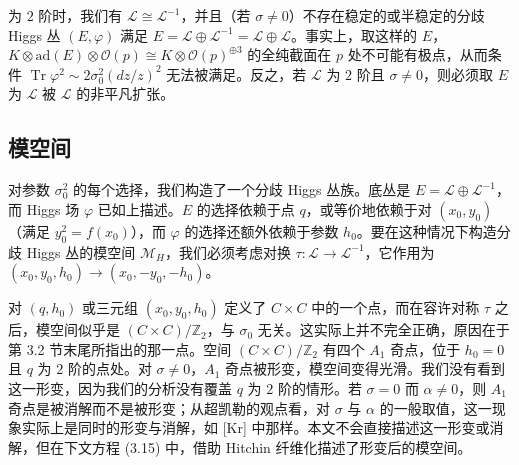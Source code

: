 为 $2$ 阶时，我们有 $\mathcal{L}\cong\mathcal{L}^{-1}$，并且（若 $\sigma\ne 0$）不存在稳定的或半稳定的分歧 Higgs 丛 $(E,\varphi)$ 满足 $E=\mathcal{L}\oplus\mathcal{L}^{-1}=\mathcal{L}\oplus\mathcal{L}$。事实上，取这样的 $E$，$K\otimes\mathrm{ad}(E)\otimes\mathcal{O}(p)\cong K\otimes\mathcal{O}(p)^{\oplus 3}$ 的全纯截面在 $p$ 处不可能有极点，从而条件 $\operatorname{Tr}\varphi^2\sim 2\sigma_0^2(dz/z)^2$ 无法被满足。反之，若 $\mathcal{L}$ 为 $2$ 阶且 $\sigma\ne 0$，则必须取 $E$ 为 $\mathcal{L}$ 被 $\mathcal{L}$ 的非平凡扩张。

\subsection{模空间}

对参数 $\sigma_0^2$ 的每个选择，我们构造了一个分歧 Higgs 丛族。底丛是 $E=\mathcal{L}\oplus\mathcal{L}^{-1}$，而 Higgs 场 $\varphi$ 已如上描述。$E$ 的选择依赖于点 $q$，或等价地依赖于对 $(x_0,y_0)$（满足 $y_0^2=f(x_0)$），而 $\varphi$ 的选择还额外依赖于参数 $h_0$。要在这种情况下构造分歧 Higgs 丛的模空间 $\mathcal{M}_H$，我们必须考虑对换 $\tau:\mathcal{L}\to\mathcal{L}^{-1}$，它作用为 $(x_0,y_0,h_0)\to(x_0,-y_0,-h_0)$。

对 $(q,h_0)$ 或三元组 $(x_0,y_0,h_0)$ 定义了 $C\times C$ 中的一个点，而在容许对称 $\tau$ 之后，模空间似乎是 $(C\times C)/\mathbb{Z}_2$，与 $\sigma_0$ 无关。这实际上并不完全正确，原因在于第 3.2 节末尾所指出的那一点。空间 $(C\times C)/\mathbb{Z}_2$ 有四个 $A_1$ 奇点，位于 $h_0=0$ 且 $q$ 为 $2$ 阶的点处。对 $\sigma\ne 0$，$A_1$ 奇点被形变，模空间变得光滑。我们没有看到这一形变，因为我们的分析没有覆盖 $q$ 为 $2$ 阶的情形。若 $\sigma=0$ 而 $\alpha\ne 0$，则 $A_1$ 奇点是被消解而不是被形变；从超凯勒的观点看，对 $\sigma$ 与 $\alpha$ 的一般取值，这一现象实际上是同时的形变与消解，如 [Kr] 中那样。本文不会直接描述这一形变或消解，但在下文方程 (3.15) 中，借助 Hitchin 纤维化描述了形变后的模空间。

